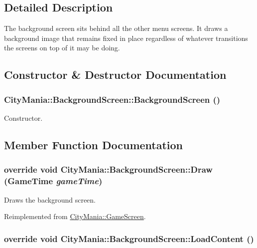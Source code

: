 \subsection{Detailed Description}
The background screen sits behind all the other menu screens. It draws a background image that remains fixed in place regardless of whatever transitions the screens on top of it may be doing. 

\subsection{Constructor \& Destructor Documentation}
\hypertarget{classCityMania_1_1BackgroundScreen_a7ad1f7edca0074fefc1561ac4997c079}{
\subsubsection[{BackgroundScreen}]{\setlength{\rightskip}{0pt plus 5cm}CityMania::BackgroundScreen::BackgroundScreen ()}}
\label{classCityMania_1_1BackgroundScreen_a7ad1f7edca0074fefc1561ac4997c079}


Constructor. 

\subsection{Member Function Documentation}
\hypertarget{classCityMania_1_1BackgroundScreen_ab1e98d9c96d18bc4395f6bbcc00a82b1}{
\subsubsection[{Draw}]{\setlength{\rightskip}{0pt plus 5cm}override void CityMania::BackgroundScreen::Draw (GameTime {\em gameTime})}}
\label{classCityMania_1_1BackgroundScreen_ab1e98d9c96d18bc4395f6bbcc00a82b1}


Draws the background screen. 

Reimplemented from \hyperlink{classCityMania_1_1GameScreen_a28fbcdba21da5e606d32d87b18bcdf29}{CityMania::GameScreen}.\hypertarget{classCityMania_1_1BackgroundScreen_a1baaefcb8bbe767c96ff168f43f9c327}{
\subsubsection[{LoadContent}]{\setlength{\rightskip}{0pt plus 5cm}override void CityMania::BackgroundScreen::LoadContent ()}}
\label{classCityMania_1_1BackgroundScreen_a1baaefcb8bbe767c96ff168f43f9c327}



